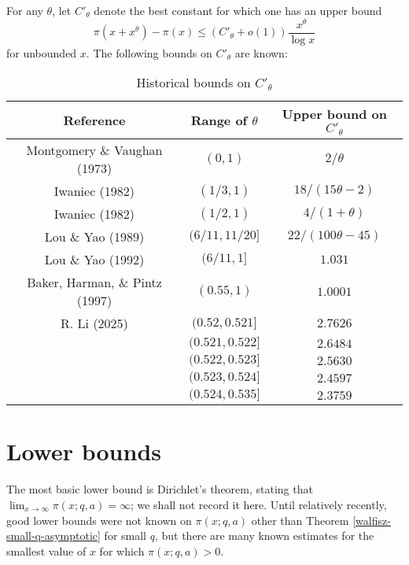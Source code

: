 For any $\theta$, let $C'_\theta$ denote the best constant for which one has an upper bound
$$\pi(x+x^\theta) - \pi(x) \leq (C'_\theta+o(1)) \frac{x^\theta}{\log x}$$
for unbounded $x$.  The following bounds on $C'_\theta$ are known:
\begin{table}[ht]
    \def\arraystretch{1.2}
    \centering
    \caption{Historical bounds on $C'_\theta$}
    \begin{tabular}{|c|c|c|}
    \hline
    Reference & Range of $\theta$ & Upper bound on $C'_\theta$\\
    \hline
    Montgomery \& Vaughan (1973) \cite{montgomery_vaughan_1973} & $(0,1)$ & $2/\theta$ \\
    \hline
    Iwaniec (1982) \cite{iwaniec_1982} & $(1/3,1)$ & $18/(15\theta-2)$ \\
    \hline
    Iwaniec (1982) \cite{iwaniec_1982} & $(1/2,1)$ & $4/(1+\theta)$ \\
    \hline
    Lou \& Yao (1989) \cite{lou-yao-1989} & $(6/11,11/20]$ & $22/(100\theta-45)$ \\
    \hline
    Lou \& Yao (1992) \cite{lou-yao-chebychev} & $(6/11,1]$ & $1.031$ \\
    \hline
    Baker, Harman, \& Pintz (1997) \cite{baker-harman-pintz_goldbach_1997} & $(0.55,1)$ & $1.0001$ \\
    \hline
    R. Li (2025) \cite{li_number_2025} 
     & $(0.52,0.521]$ & $2.7626$\\
     & $(0.521,0.522]$ & $2.6484$\\
     & $(0.522,0.523]$ & $2.5630$\\
     & $(0.523,0.524]$ & $2.4597$\\
     & $(0.524,0.535]$ & $2.3759$\\
    \hline
    \end{tabular}
\label{bt-ctheta'-table}
\end{table}



\section{Lower bounds}
The most basic lower bound is Dirichlet's theorem, stating that $\lim_{x\to\infty}\pi(x;q,a)=\infty$; we shall not record it here. Until relatively recently, good lower bounds were not known on $\pi(x;q,a)$ other than Theorem \ref{walfisz-small-q-asymptotic} for small $q$, but there are many known estimates for the smallest value of $x$ for which $\pi(x;q,a)>0$.

